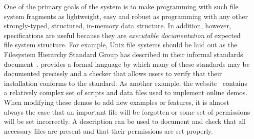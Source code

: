 One of the primary goals of the system is
to make programming with such file system fragments
as lightweight, easy and robust as programming with any other strongly-typed,
structured, in-memory \haskell{} data structure.  In addition, however,
\forest{} specifications are useful because they are {\em executable 
documentation} of expected file system structure.  For example, Unix file
systems should be laid out as the
Filesystem Hierarchy Standard Group has described in their informal
standards document~\cite{fsh}.  \forest{} provides a formal language
by which many of these standards may be documented precisely and
a checker that allows users to verify that their installation
conforms to the standard. As another example, the 
\pads{} website~\cite{padsweb}
contains a relatively complex set of scripts and data files used to
implement online demos.  
When modifying these demos to add new examples
or features, it is almost always the case that an important
file will be forgotten or some set of permissions will be set incorrectly.
A \forest{} description can be used to document and check that
all necessary files are present and that their permissions are set properly.

